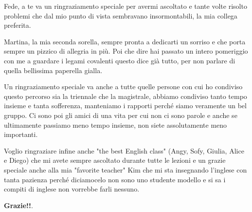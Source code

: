 Fede, a te va un ringraziamento speciale per avermi ascoltato e tante volte risolto problemi che dal mio punto di vista sembravano insormontabili, la mia collega preferita. 

Martina, la mia seconda sorella, sempre pronta a dedicarti un sorriso e che porta sempre un pizzico di allegria in più. Poi che dire hai passato un intero pomeriggio con me a guardare i legami covalenti questo dice già tutto, per non parlare di quella bellissima paperella gialla. 

Un ringraziamento speciale va anche a tutte quelle persone con cui ho condiviso questo percorso sia la triennale che la magistrale, abbiamo condiviso tanto tempo insieme e tanta sofferenza, manteniamo i rapporti perché siamo veramente un bel gruppo. Ci sono poi gli amici di una vita per cui non ci sono parole e anche se ultimamente passiamo meno tempo insieme, non siete assolutamente meno importanti. 

Voglio ringraziare infine anche "the best English class" (Angy, Sofy, Giulia, Alice e Diego) che mi avete sempre ascoltato durante tutte le lezioni e un grazie speciale anche alla mia "favorite teacher" Kim che mi sta insegnando l'inglese con tanta pazienza perché diciamocelo non sono uno studente modello e si sa i compiti di inglese non vorrebbe farli nessuno.

\textbf{Grazie!!}.